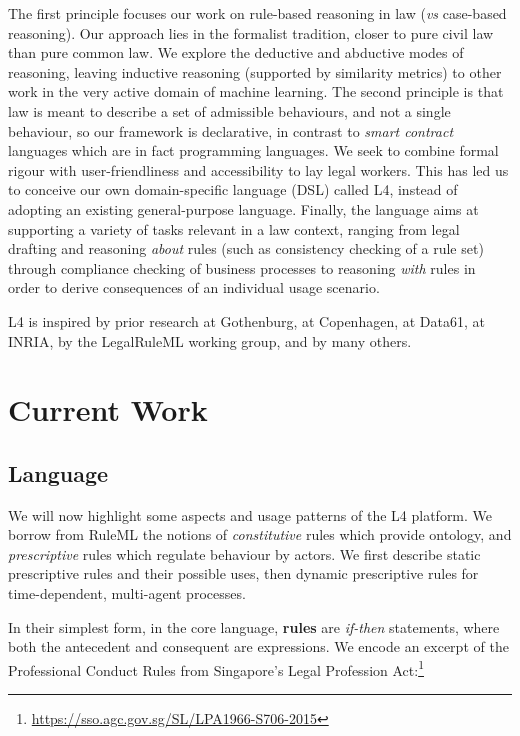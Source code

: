 \documentclass[runningheads]{llncs}
\begin{document}
The first principle focuses our work on rule-based reasoning in law (\emph{vs} case-based reasoning). Our approach lies in the formalist tradition, closer to pure civil law than pure common law. We explore the deductive and abductive modes of reasoning, leaving inductive reasoning (supported by similarity metrics) to other work in the very active domain of machine learning.
The second principle is that law is meant to
describe a set of admissible behaviours, and not a single behaviour, so our
framework is declarative, in contrast to
\emph{smart contract} languages which are in fact programming
languages. We seek to combine formal rigour with
user-friendliness and accessibility to lay legal workers. This has led us to conceive our own domain-specific language
(DSL) called L4, instead of adopting an existing general-purpose
language.
Finally, the language aims at supporting a variety of tasks relevant
in a law context, ranging from legal drafting and reasoning \emph{about} rules
(such as consistency checking of a rule set) through compliance checking of
business processes to reasoning \emph{with} rules in order to derive
consequences of an individual usage scenario.

L4 is inspired by prior research at Gothenburg, at Copenhagen, at Data61, at INRIA, by the
LegalRuleML working group, and by many others.

\section{Current Work}\label{sec:current_work}

\subsection{Language}\label{sec:language}

We will now highlight some aspects and usage patterns of the L4
platform. We borrow from RuleML the notions of \emph{constitutive} rules which provide ontology, and \emph{prescriptive} rules which regulate behaviour by actors. We first describe static prescriptive rules and their possible uses, then dynamic prescriptive rules for time-dependent, multi-agent processes.

In their simplest form, in the core language, \textbf{rules} are \emph{if-then} statements, where both the
antecedent and consequent are expressions. We encode an
excerpt of the Professional Conduct Rules from Singapore's Legal Profession
Act:\footnote{\url{https://sso.agc.gov.sg/SL/LPA1966-S706-2015}}
\end{document}
